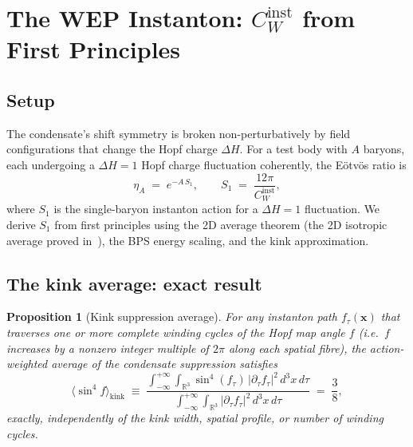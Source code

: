 \documentclass[11pt,a4paper]{article}
\newtheorem{proposition}[theorem]{Proposition}
\theoremstyle{definition}
\theoremstyle{remark}
\begin{document}
\section{The WEP Instanton: $C_W^{\mathrm{inst}}$ from First Principles}
\label{P5:sec:instanton}

\subsection{Setup}

The condensate's shift symmetry is broken non-perturbatively by
field configurations that change the Hopf charge $\Delta H$.
For a test body with $A$ baryons, each undergoing a $\Delta H=1$
Hopf charge fluctuation coherently, the E\"{o}tv\"{o}s ratio is
\begin{equation}
  \eta_A \;=\; e^{-A\,S_1},
  \qquad
  S_1 \;=\; \frac{12\pi}{C_W^{\mathrm{inst}}},
  \label{P5:eq:WEP_formula}
\end{equation}
where $S_1$ is the single-baryon instanton action for a $\Delta H=1$
fluctuation. We derive $S_1$ from first principles using the 2D average
theorem (the 2D isotropic average proved in~\cite{Paper1}), the BPS energy
scaling, and the kink approximation.

\subsection{The kink average: exact result}

\begin{proposition}[Kink suppression average]
\label{P5:prop:kink_avg}
For any instanton path $f_\tau(\mathbf{x})$ that traverses one or more
complete winding cycles of the Hopf map angle $f$ (i.e.\ $f$ increases
by a nonzero integer multiple of $2\pi$ along each spatial fibre), the
action-weighted average of the condensate suppression satisfies
\begin{equation}
  \langle\sin^4\!f\rangle_{\mathrm{kink}}
  \;\equiv\;
  \frac{\displaystyle\int_{-\infty}^{+\infty}\!\!
    \int_{\mathbb{R}^3}\sin^4(f_\tau)\,|\partial_\tau f_\tau|^2
          \,d^3x\,d\tau}
       {\displaystyle\int_{-\infty}^{+\infty}\!\!
    \int_{\mathbb{R}^3}|\partial_\tau f_\tau|^2
          \,d^3x\,d\tau}
  \;=\; \frac{3}{8},
  \label{P5:eq:kink_avg}
\end{equation}
\emph{exactly}, independently of the kink width, spatial profile, or
number of winding cycles.
\end{proposition}
\end{document}
